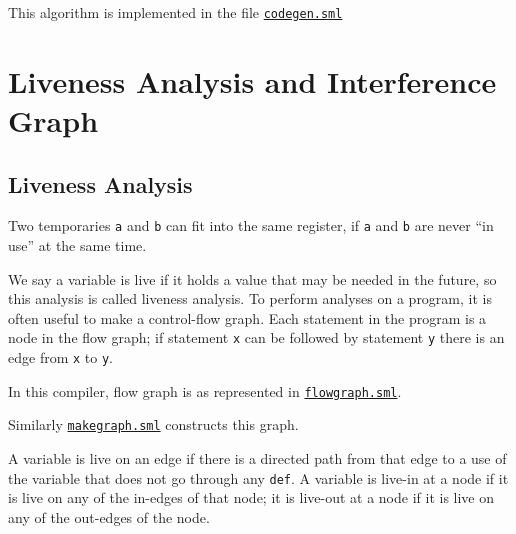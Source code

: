 This algorithm is implemented in the file
\href{https://www.github.com/sourabh2311/btp/tree/master/Compiler/codegen.sml}{\texttt{codegen.sml}}

\section{Liveness Analysis and Interference Graph}


\hypertarget{liveness-analysis}{%
\subsection{Liveness Analysis}\label{liveness-analysis}}

Two temporaries
\texttt{a} and
\texttt{b} can
fit into the same register, if
\texttt{a} and
\texttt{b} are
never ``in use'' at the same time.

We say a variable is live if it holds a value that may be needed in the
future, so this analysis is called liveness analysis. To perform
analyses on a program, it is often useful to make a control-flow graph.
Each statement in the program is a node in the flow graph; if statement
\texttt{x} can
be followed by statement
\texttt{y} there
is an edge from
\texttt{x} to
\texttt{y}.

In this compiler, flow graph is as represented in
\href{https://www.github.com/sourabh2311/btp/tree/master/Compiler/flowgraph.sml}{\texttt{flowgraph.sml}}.

Similarly
\href{https://www.github.com/sourabh2311/btp/tree/master/Compiler/flowgraph.sml}{\texttt{makegraph.sml}}
constructs this graph.

A variable is live on an edge if there is a directed path from that edge
to a use of the variable that does not go through any
\texttt{def}. A
variable is live-in at a node if it is live on any of the in-edges of
that node; it is live-out at a node if it is live on any of the
out-edges of the node.

